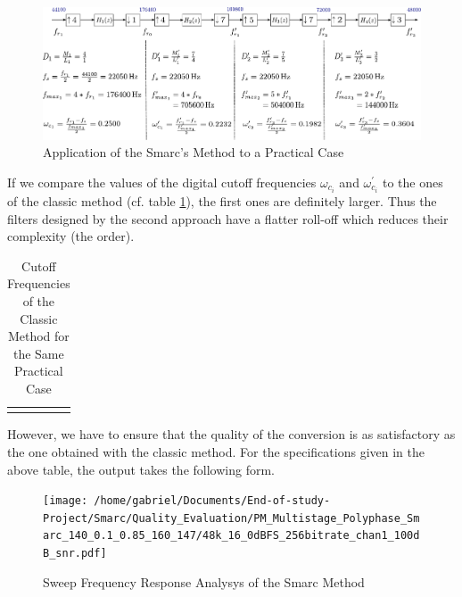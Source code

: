 \begin{figure}[ht!]
	\hspace*{-1cm}
	\centering
	\includegraphics[scale=0.8]{smarc.pdf}
	\caption{Application of the Smarc's Method to a Practical Case}\label{Figure 3.27}
\end{figure}

If we compare the values of the digital cutoff frequencies $\omega_{c_i}$ and $\omega^{\prime}_{c_i}$ to the ones of the classic method (cf. table \ref{tab:cutoff_classic}), the first ones are definitely larger. Thus the filters designed by the second approach have a flatter roll-off which reduces their complexity (the order). 


\begin{table}[ht!]
	\centering
	\begin{tabular}{|c|c|c|c|}\hline
		 \makebox[8em]{Stage 1} &  \makebox[8em]{Stage 2} &  \makebox[8em]{Stage 3} &  \makebox[8em]{Stage 3}\\ \hline
		 \makebox[8em]{$\omega_{c_1} = 0.2500$} &  \makebox[8em]{$\omega_{c_2} = 0.1429$} &  \makebox[8em]{$\omega_{c_3} = 0.1429$} &  \makebox[8em]{$\omega_{c_4} = 0.3333$}\\ \hline
	\end{tabular}
\captionsetup{width=0.95\linewidth}
\caption{Cutoff Frequencies of the Classic Method for the Same Practical Case}
\label{tab:cutoff_classic}
\end{table}


However, we have to ensure that the quality of the conversion is as satisfactory as the one obtained with the classic method.
For the specifications given in the above table, the output takes the following form. 

\begin{figure}[ht!]
	\centering
	\texttt{[image: /home/gabriel/Documents/End-of-study-Project/Smarc/Quality\_Evaluation/PM\_Multistage\_Polyphase\_Smarc\_140\_0.1\_0.85\_160\_147/48k\_16\_0dBFS\_256bitrate\_chan1\_100dB\_snr.pdf]}
	\captionsetup{width=0.95\linewidth}
	\caption{Sweep Frequency Response Analysys of the Smarc Method}\label{Figure 3.28}
\end{figure}


